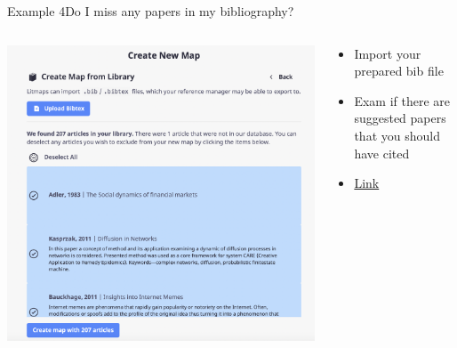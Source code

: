 \documentclass[aspectratio=43]{beamer}
\begin{document}
\begin{frame}{Example 4}{Do I miss any papers in my bibliography? \cite{cw2021epidemiology}}
    \begin{columns}[T]
    \vspace{0pt}
    \begin{column}{.60\textwidth}
        \includegraphics[width=\textwidth]{figures/Exam4.png}

        \vspace*{50mm} %
    \end{column}
    
    \hfill
    
    \begin{column}{.40\textwidth}
        \begin{itemize}
            \item Import your prepared bib file
            \item Exam if there are suggested papers that you should have cited
            \item  \href{https://app.litmaps.co/shared/EC5E5430-1D25-439A-9254-C2025B459D68}{Link}
        \end{itemize}
    \end{column}
    \end{columns}
\end{frame}
\end{document}
